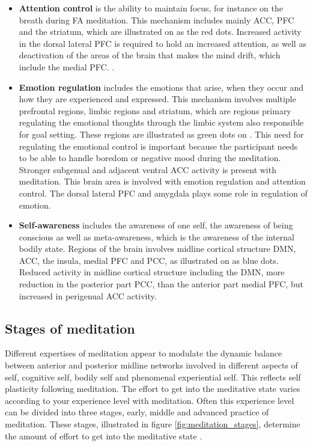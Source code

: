 \begin{itemize}
	\item \textbf{Attention control} is the ability to maintain focus, for instance on the breath during FA meditation. This mechanism includes mainly ACC, PFC and the striatum, which are illustrated on  as the red dots. Increased activity in the dorsal lateral PFC is required to hold an increased attention, as well as deactivation of the areas of the brain that makes the mind drift, which include the medial PFC. \cite{Tang2017}.
	\item \textbf{Emotion regulation}
	includes the emotions that arise, when they occur and how they are experienced and expressed. This mechanism involves multiple prefrontal regions, limbic regions and striatum, which are regions primary regulating the emotional thoughts through the limbic system also responsible for goal setting. These regions are illustrated as green dots on . This need for regulating the emotional control is important because the participant needs to be able to handle boredom or negative mood during the meditation. Stronger subgenual and adjacent ventral ACC activity is present with meditation. This brain area is involved with emotion regulation and attention control. The dorsal lateral PFC and amygdala plays some role in regulation of emotion. 
	\item \textbf{Self-awareness} includes the awareness of one self, the awareness of being conscious as well as meta-awareness, which is the awareness of the internal bodily state. Regions of the brain involves midline cortical structure DMN, ACC, the insula, medial PFC and PCC, as illustrated on  as blue dots. Reduced activity in midline cortical structure including the DMN, more reduction in the posterior part PCC, than the anterior part medial PFC, but increased in perigenual ACC activity.
\end{itemize}


\subsection{Stages of meditation}
Different expertises of meditation appear to modulate the dynamic balance between anterior and posterior midline networks involved in different aspects of self, cognitive self, bodily self and phenomenal experiential self. This reflects self plasticity following meditation. 
The effort to get into the meditative state varies according to your experience level with meditation. Often this experience level can be divided into three stages, early, middle and advanced practice of meditation. These stages, illustrated in figure \ref{fig:meditation_stages}, determine the amount of effort to get into the meditative state \cite{Tang2017}. 

